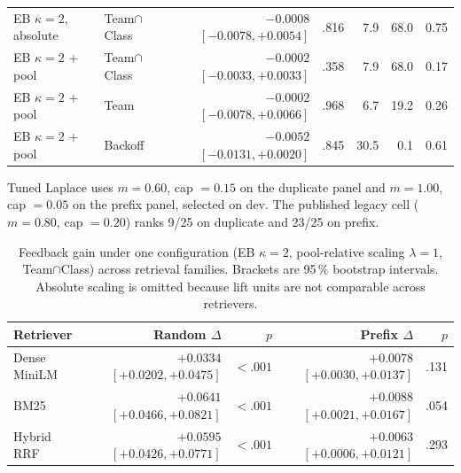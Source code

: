 \begin{table}[t]
\begin{threeparttable}
\begin{tabular}{@{}llrrrrr@{}}
EB $\kappa=2$, absolute   & Team$\cap$Class & $-0.0008$ $[-0.0078, +0.0054]$ & .816 & 7.9 & 68.0 & 0.75 \\
EB $\kappa=2$ + pool       & Team$\cap$Class & $-0.0002$ $[-0.0033, +0.0033]$ & .358 & 7.9 & 68.0 & 0.17 \\
EB $\kappa=2$ + pool       & Team            & $-0.0002$ $[-0.0078, +0.0066]$ & .968 & 6.7 & 19.2 & 0.26 \\
EB $\kappa=2$ + pool       & Backoff         & $-0.0052$ $[-0.0131, +0.0020]$ & .845 & 30.5 & 0.1 & 0.61 \\
\bottomrule
\end{tabular}
\begin{tablenotes}[flushleft]
\footnotesize
\item Tuned Laplace uses $m=0.60$, cap $=0.15$ on the duplicate panel and
$m=1.00$, cap $=0.05$ on the prefix panel, selected on dev. The published legacy
cell ($m=0.80$, cap $=0.20$) ranks 9/25 on duplicate and 23/25 on prefix.
\end{tablenotes}
\end{threeparttable}
\end{table}

\begin{table}[t]
\centering
\caption{Feedback gain under one configuration (EB $\kappa=2$, pool-relative
scaling $\lambda=1$, Team$\cap$Class) across retrieval families. Brackets are
95\,\% bootstrap intervals. Absolute scaling is omitted because lift units are
not comparable across retrievers.}
\label{tab:matched}
\begin{tabular}{@{}lrrrr@{}}
\toprule
Retriever & Random $\Delta$ & $p$ & Prefix $\Delta$ & $p$ \\
\midrule
Dense MiniLM & $+0.0334$ $[+0.0202, +0.0475]$ & $<.001$ & $+0.0078$ $[+0.0030, +0.0137]$ & .131 \\
BM25         & $+0.0641$ $[+0.0466, +0.0821]$ & $<.001$ & $+0.0088$ $[+0.0021, +0.0167]$ & .054 \\
Hybrid RRF   & $+0.0595$ $[+0.0426, +0.0771]$ & $<.001$ & $+0.0063$ $[+0.0006, +0.0121]$ & .293 \\
\bottomrule
\end{tabular}
\end{table}

